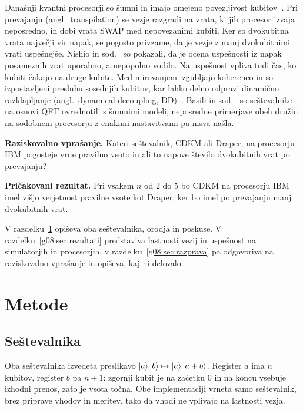 Današnji kvantni procesorji so šumni in imajo omejeno povezljivost kubitov~\cite{preskill2018}. Pri prevajanju (angl.\ transpilation) se vezje razgradi na vrata, ki jih procesor izvaja neposredno, in dobi vrata SWAP med nepovezanimi kubiti. Ker so dvokubitna vrata največji vir napak, se pogosto privzame, da je vezje z manj dvokubitnimi vrati uspešnejše. Nishio in sod.~\cite{g08:nishio2020} so pokazali, da je ocena uspešnosti iz napak posameznih vrat uporabno, a nepopolno vodilo. Na uspešnost vpliva tudi čas, ko kubiti čakajo na druge kubite. Med mirovanjem izgubljajo koherenco in so izpostavljeni presluhu sosednjih kubitov, kar lahko delno odpravi dinamično razklapljanje (angl.\ dynamical decoupling, DD)~\cite{g08:viola1999,g08:tripathi2022,g08:ezzell2023}. Basili in sod.~\cite{g08:basili2025} so seštevalnike na osnovi QFT ovrednotili s šumnimi modeli, neposredne primerjave obeh družin na sodobnem procesorju z enakimi nastavitvami pa nisva našla.

\begin{svgraybox}
\textbf{Raziskovalno vprašanje.} Kateri seštevalnik, CDKM ali Draper, na procesorju IBM pogosteje vrne pravilno vsoto in ali to napove število dvokubitnih vrat po prevajanju?

\textbf{Pričakovani rezultat.} Pri vsakem $n$ od $2$ do $5$ bo CDKM na procesorju IBM imel višjo verjetnost pravilne vsote kot Draper, ker bo imel po prevajanju manj dvokubitnih vrat.
\end{svgraybox}

V razdelku~\ref{g08:sec:metode} opiševa oba seštevalnika, orodja in poskuse. V razdelku~\ref{g08:sec:rezultati} predstaviva lastnosti vezij in uspešnost na simulatorjih in procesorjih, v razdelku~\ref{g08:sec:razprava} pa odgovoriva na raziskovalno vprašanje in opiševa, kaj ni delovalo.


\section{Metode}
\label{g08:sec:metode}

\subsection{Seštevalnika}
\label{g08:sec:sestevalnika}

Oba seštevalnika izvedeta preslikavo $\ket{a}\ket{b} \mapsto \ket{a}\ket{a+b}$. Register $a$ ima $n$ kubitov, register $b$ pa $n+1$: zgornji kubit je na začetku $0$ in na koncu vsebuje izhodni prenos, zato je vsota točna. Obe implementaciji vrneta samo seštevalnik, brez priprave vhodov in meritev, tako da vhodi ne vplivajo na lastnosti vezja.

